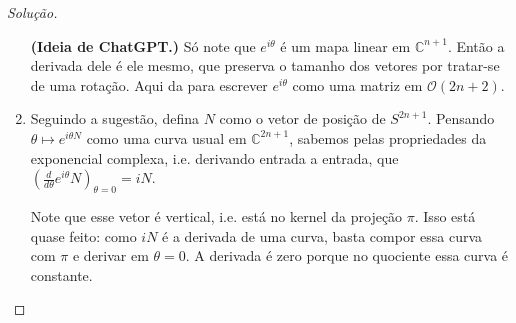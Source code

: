 \begin{proof}[Solução]
\begin{enumerate}[label=(\alph*)]
	\textbf{(Ideia de ChatGPT.)} Só note que \(e^{i\theta}\) é um mapa linear em \(\mathbb{C}^{n+1}\). Então a derivada dele é ele mesmo, que preserva o tamanho dos vetores por tratar-se de uma rotação. Aqui da para escrever \(e^{i\theta}\) como uma matriz em \(\mathcal{O}(2n+2)\).\fi
\item Seguindo a sugestão, defina \(N\) como o vetor de posição de \(S^{2n+1}\). Pensando \(\theta \mapsto e^{i\theta N}\) como uma curva usual em \(\mathbb{C}^{2n+1}\), sabemos pelas propriedades da exponencial complexa, i.e. derivando entrada a entrada, que \((\frac{d}{d\theta}e^{i\theta}N)_{\theta=0}=i N\).

	Note que esse vetor é vertical, i.e. está no kernel da projeção \(\pi\). Isso está quase feito: como \(i N\) é a derivada de uma curva, basta compor essa curva com \(\pi\) e derivar em \(\theta=0\). A derivada é zero porque no quociente essa curva é constante.


\end{enumerate}
\end{proof}
